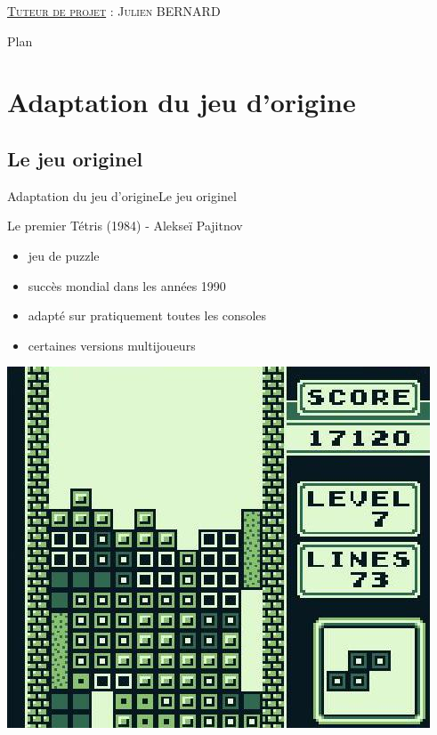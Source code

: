 \documentclass[french]{beamer}
\begin{document}
\begin{frame}
	\vspace{-0.20cm}
	

	\vspace{0.20cm}

	\textsc{\underline{Tuteur de projet} : Julien BERNARD}

\hspace{2cm}

\end{frame}

\begin{frame}{Plan}

	\tableofcontents

\end{frame}


\section{Adaptation du jeu d'origine}
	\subsection{Le jeu originel}

\begin{frame}{Adaptation du jeu d'origine}{Le jeu originel}

	\begin{block}{Le premier Tétris (1984) - Alekseï Pajitnov}
		\begin{itemize}
			\item jeu de puzzle
			\item succès mondial dans les années 1990
			\item adapté sur pratiquement toutes les consoles
			\item certaines versions multijoueurs
		\end{itemize}

	\end{block}

	\begin{center}
		\includegraphics[scale=0.25]{img/Tetris8.jpg}
	\end{center}
\end{frame}
\end{document}
